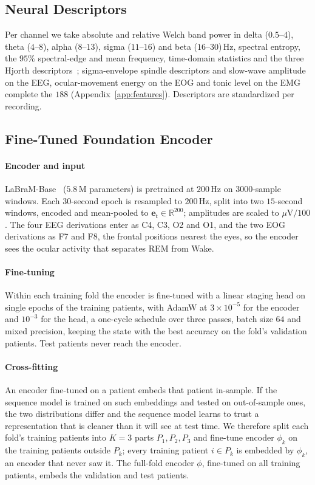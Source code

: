 \documentclass{ieeeaccess}
\begin{document}
\subsection{Neural Descriptors}
\label{sec:features}
Per channel we take absolute and relative Welch band power in delta ($0.5$--$4$), theta
($4$--$8$), alpha ($8$--$13$), sigma ($11$--$16$) and beta ($16$--$30$)\,Hz, spectral entropy,
the $95\%$ spectral-edge and mean frequency, time-domain statistics and the three Hjorth
descriptors~\cite{hjorth1970eeg}; sigma-envelope spindle descriptors and slow-wave amplitude on
the EEG, ocular-movement energy on the EOG and tonic level on the EMG complete the $188$
(Appendix~\ref{app:features}). Descriptors are standardized per recording.

\subsection{Fine-Tuned Foundation Encoder}
\label{sec:encoder}
\paragraph{Encoder and input} LaBraM-Base~\cite{labram2024} ($5.8$\,M parameters) is
pretrained at $200$\,Hz on $3000$-sample windows. Each $30$-second epoch is resampled to
$200$\,Hz, split into two $15$-second windows, encoded and mean-pooled to
$\mathbf{e}_t\in\mathbb{R}^{200}$; amplitudes are scaled to $\mu$V$/100$. The four EEG derivations
enter as C4, C3, O2 and O1, and the two EOG derivations as F7 and F8, the frontal positions
nearest the eyes, so the encoder sees the ocular activity that separates REM from Wake.

\paragraph{Fine-tuning} Within each training fold the encoder is fine-tuned with a linear
staging head on single epochs of the training patients, with AdamW at $3\times10^{-5}$ for the
encoder and $10^{-3}$ for the head, a one-cycle schedule over three passes, batch size $64$ and
mixed precision, keeping the state with the best accuracy on the fold's validation patients.
Test patients never reach the encoder.

\paragraph{Cross-fitting} An encoder fine-tuned on a patient embeds that patient in-sample.
If the sequence model is trained on such embeddings and tested on out-of-sample ones, the two
distributions differ and the sequence model learns to trust a representation that is cleaner
than it will see at test time. We therefore split each fold's training patients into $K=3$
parts $P_1,P_2,P_3$ and fine-tune encoder $\phi_k$ on the training patients outside $P_k$;
every training patient $i\in P_k$ is embedded by $\phi_k$, an encoder that never saw it. The
full-fold encoder $\phi$, fine-tuned on all training patients, embeds the validation and test
patients.
\end{document}
